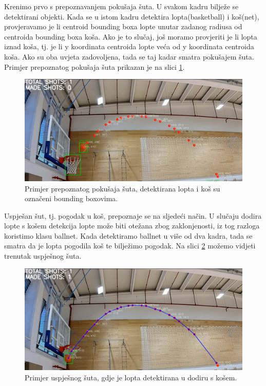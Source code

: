 \documentclass[zavrsnirad]{fer}
\begin{document}
Krenimo prvo s prepoznavanjem pokušaja šuta.
U svakom kadru bilježe se detektirani objekti.
Kada se u istom kadru detektira lopta(basketball) i koš(net), provjeravamo je li centroid bounding boxa lopte unutar zadanog radiusa od centroida bounding boxa koša. 
Ako je to slučaj, još moramo provjeriti je li lopta iznad koša, tj. je li y koordinata centroida lopte veća od y koordinata centroida koša.
Ako su oba uvjeta zadovoljena, tada se taj kadar smatra pokušajem šuta.
Primjer prepoznatog pokušaja šuta prikazan je na slici \ref{fig:attempted_shot}.
\begin{figure}[H]
  \centering
  \includegraphics[width=\textwidth]{Figures/shot_attempt.png}
  \caption{Primjer prepoznatog pokušaja šuta, detektirana lopta i koš su označeni bounding boxovima.}
  \label{fig:attempted_shot}
\end{figure}
Uspješan šut, tj. pogodak u koš, prepoznaje se na sljedeći način.
U slučaju dodira lopte s košem detekcija lopte može biti otežana zbog zaklonjenosti, iz tog razloga koristimo klasu ballnet.
Kada detektiramo ballnet u više od dva kadra, tada se smatra da je lopta pogodila koš te bilježimo pogodak.
Na slici \ref{fig:made_shot} možemo vidjeti trenutak uspješnog šuta.

\begin{figure}[H]
  \centering
  \includegraphics[width=\textwidth]{Figures/made_shot.png}
  \caption{Primjer uspješnog šuta, gdje je lopta detektirana u dodiru s košem.}
  \label{fig:made_shot}
\end{figure}
\end{document}
